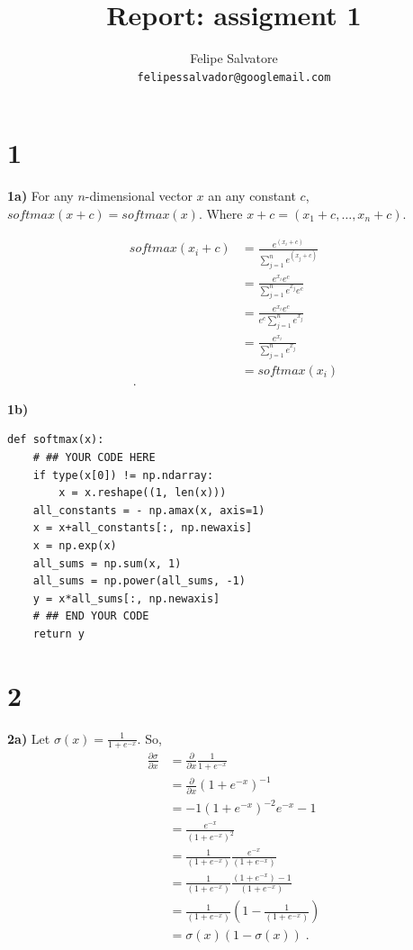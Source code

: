 \documentclass{article}
\title{Report: assigment 1}
\author{Felipe Salvatore\\
\texttt{felipessalvador@googlemail.com}}
\begin{document}
\maketitle
\section{1}
\textbf{1a)} For any $n$-dimensional vector $x$ an any constant $c$, $softmax(x +c) = softmax(x)$. Where $x+c = (x_1 +c,\dots,x_n +c)$.

\begin{align*}
softmax(x_i +c) & = \frac{e^{(x_{i}+c)}}{\sum_{j=1}^{n} e^{(x_j + c)}} \\
& = \frac{e^{x_{i}}e^{c}}{\sum_{j=1}^{n} e^{x_j}e^{c}}\\
& = \frac{e^{x_{i}}e^{c}}{e^{c}\sum_{j=1}^{n} e^{x_j}}\\
& = \frac{e^{x_{i}}}{\sum_{j=1}^{n} e^{x_j}}\\
& = softmax(x_i)\\ \; .
\end{align*}


\textbf{1b)}

\begin{verbatim}
def softmax(x):
    # ## YOUR CODE HERE
    if type(x[0]) != np.ndarray:
        x = x.reshape((1, len(x)))
    all_constants = - np.amax(x, axis=1)
    x = x+all_constants[:, np.newaxis]
    x = np.exp(x)
    all_sums = np.sum(x, 1)
    all_sums = np.power(all_sums, -1)
    y = x*all_sums[:, np.newaxis]
    # ## END YOUR CODE
    return y
\end{verbatim}
\section{2}
\textbf{2a)} Let $\sigma(x) = \frac{1}{1+e^{-x}}$. So, 
\begin{align*}
\frac{\partial \sigma}{\partial x} & = \frac{\partial}{\partial x}\frac{1}{1+e^{-x}} \\
& =\frac{\partial }{\partial x}(1+e^{-x})^{-1} \\
& = -1 (1+e^{-x})^{-2}e^{-x} -1\\
& = \frac{e^{-x}}{(1+e^{-x})^{2}}\\
& = \frac{1}{(1+e^{-x})}\frac{e^{-x}}{(1+e^{-x})}\\
& = \frac{1}{(1+e^{-x})}\frac{(1+e^{-x}) -1}{(1+e^{-x})}\\
& = \frac{1}{(1+e^{-x})}(1 - \frac{1}{(1+e^{-x})})\\
& = \sigma(x)(1 - \sigma(x)) \; .
\end{align*}
\end{document}
